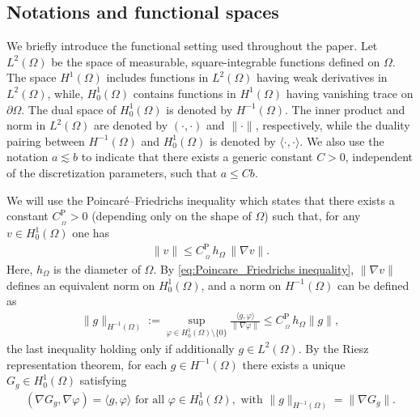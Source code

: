 \documentclass[review,11pt]{article}
\numberwithin{equation}{section}
\def \f  {\varphi}
\def \Om {\Omega}
\def \p  {\partial}
\def \R  {{\mathbb{R}}}
\begin{document}
\subsection{Notations and functional spaces}\label{subsec:functional-spaces}
We briefly introduce the functional setting used throughout the paper. 
Let $L^2(\Omega)$ be the space of measurable, square-integrable functions defined on $\Omega$. The space $H^1(\Omega)$ includes functions in $L^2(\Omega)$ having weak derivatives in $L^2(\Omega)$, while, $H^1_0(\Omega)$ contains functions in $H^1(\Omega)$ having vanishing trace on $\partial \Omega$. 
The dual space of $H^1_0(\Omega)$ is denoted by $H^{-1}(\Omega)$. The inner product and norm in $L^2(\Omega)$ are denoted by $(\cdot, \cdot)$ and $\|\cdot\|$, respectively, while the duality pairing between $H^{-1}(\Omega)$ and $H_0^1(\Omega)$ is denoted by $\langle \cdot, \cdot \rangle$. We also use the notation $a\lesssim b$ to indicate that there exists a generic constant $C>0$, independent of the discretization parameters, such that $a\leq Cb$.

We will use the Poincar\'e--Friedrichs inequality which states that there exists a constant $C_{\,\!_{\Omega}}^{\mathrm{P}} > 0$ (depending only on the shape of $\Omega$) such that, for any $v \in H_0^1(\Omega)$ one has
\begin{align}\label{eq:Poincare_Friedrichs inequality}
\|v\|\le C_{\,\!_{\Omega}}^{\mathrm{P}} \, h_\Om\,\|\nabla v\|.
\end{align}
\noindent
Here, $h_\Om$ is the diameter of $\Om$. By \eqref{eq:Poincare_Friedrichs inequality}, $\|\nabla v\|$ defines an equivalent norm on $H_0^1(\Omega)$, and a norm on $H^{-1}(\Omega)$ can be defined as
\begin{align}
    \|g\|_{H^{-1}(\Omega)} 
:= \sup_{\varphi \in H_0^1(\Omega)\setminus \{0\}} 
\frac{\langle g, \varphi \rangle}{\|\nabla \varphi\|} \leq C_{\,\!_{\Omega}}^{\mathrm{P}} \, h_\Om \|g\|,\label{eq:defHinv_norm}
\end{align}
the last inequality holding only if additionally $g\in L^2(\Om)$.
By the Riesz representation theorem, for each $g \in H^{-1}(\Omega)$ there exists a unique $G_g \in H_0^1(\Omega)$ satisfying
\begin{align}\label{eq:weak_poisson}
(\nabla G_g, \nabla \varphi) = \langle g, \varphi \rangle \text{ for all } \varphi \in H_0^1(\Omega), \text{ with } \|g\|_{H^{-1}(\Omega)} = \|\nabla G_g\|.
\end{align}
\end{document}
